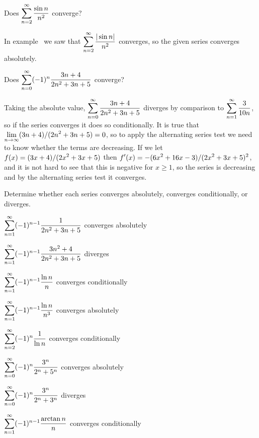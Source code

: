 \example Does $\displaystyle\sum_{n=2}^\infty {\sin n\over n^2}$ converge?

\ssk\noindent
In example~ we saw that 
$\displaystyle\sum_{n=2}^\infty {|\sin n|\over n^2}$ converges, so the given
series converges absolutely.
\endexample

\example Does $\displaystyle\sum_{n=0}^\infty (-1)^{n}{3n+4\over 2n^2+3n+5}$ converge?

\ssk\noindent
Taking the absolute value, $\displaystyle\sum_{n=0}^\infty {3n+4\over 2n^2+3n+5}$
diverges by comparison to $\displaystyle\sum_{n=1}^\infty {3\over 10n}$, so if
the series converges it does so conditionally. It is true that
$\displaystyle\lim_{n\to\infty}(3n+4)/(2n^2+3n+5)=0$, so to apply the
alternating series test we need to know whether the terms are
decreasing.
If we let $\displaystyle f(x)=(3x+4)/(2x^2+3x+5)$ then 
$\displaystyle f'(x)=-(6x^2+16x-3)/(2x^2+3x+5)^2$, and it is not hard to see that
this is negative for $x\ge1$, so the series is decreasing and by the
alternating series test it converges.
\endexample

\exercises

Determine whether each series converges absolutely, converges
conditionally, or diverges.

\twocol

\exercise $\displaystyle\sum_{n=1}^\infty (-1)^{n-1}{1\over 2n^2+3n+5}$
\answer converges absolutely
\endanswer
\endexercise

\exercise $\displaystyle\sum_{n=1}^\infty (-1)^{n-1}{3n^2+4\over 2n^2+3n+5}$
\answer diverges
\endanswer
\endexercise

\exercise $\displaystyle\sum_{n=1}^\infty (-1)^{n-1}{\ln n\over n}$
\answer converges conditionally
\endanswer
\endexercise

\exercise $\displaystyle\sum_{n=1}^\infty (-1)^{n-1} {\ln n\over n^3}$
\answer converges absolutely
\endanswer
\endexercise

\exercise $\displaystyle\sum_{n=2}^\infty (-1)^n{1\over \ln n}$
\answer converges conditionally
\endanswer
\endexercise

\exercise $\displaystyle\sum_{n=0}^\infty (-1)^{n} {3^n\over 2^n+5^n}$
\answer converges absolutely
\endanswer
\endexercise

\exercise $\displaystyle\sum_{n=0}^\infty (-1)^{n} {3^n\over 2^n+3^n}$
\answer diverges
\endanswer
\endexercise

\exercise $\displaystyle\sum_{n=1}^\infty (-1)^{n-1} {\arctan n\over n}$
\answer converges conditionally
\endanswer

\endtwocol
\endexercise

\endexercises



